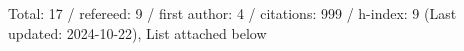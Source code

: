 Total: 17 / refereed: 9 / first author: 4 / citations: 999 / h-index: 9 (Last updated: 2024-10-22), List attached below